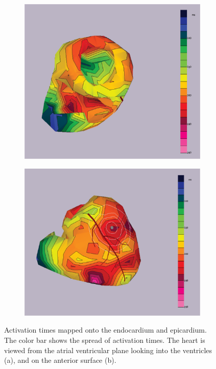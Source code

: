 \documentclass[12pt]{article}
\begin{document}
\begin{figure}[H]
	\begin{subfigure}{.5\textwidth}
		\centering
		\includegraphics[width=.95\linewidth]{Figures/1_2_recTimes_1.png}
		\caption{}
		
	\end{subfigure}%
	\begin{subfigure}{.5\textwidth}
		\centering
		\includegraphics[width=.95\linewidth]{Figures/1_2_recTimes_2.png}
		\caption{}
		
	\end{subfigure}
	\caption{Activation times mapped onto the endocardium and epicardium. The color bar shows the spread of activation times. The heart is viewed from the atrial ventricular plane looking into the ventricles (a), and on the anterior surface (b).}
	\label{1_2_recTimes}
\end{figure}
\end{document}
